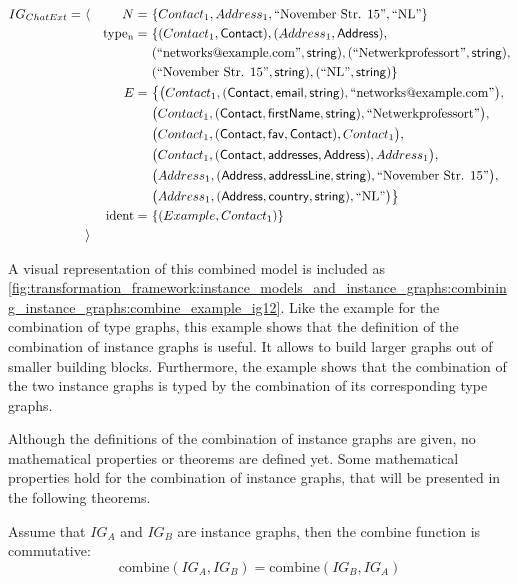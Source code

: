 \begin{align*}
IG_{ChatExt} =\ &\langle&
N =\ &\{ Contact_1, Address_1, \text{``November Str. 15''}, \text{``NL''} \} \\&&
\mathrm{type_{n}} =\ &\{
( Contact_1, \mathsf{Contact} ),
( Address_1, \mathsf{Address} ),\\&&&
( \text{``networks@example.com''}, \mathsf{string} ),
( \text{``Netwerkprofessort''}, \mathsf{string} ),\\&&&
( \text{``November Str. 15''}, \mathsf{string} ),
( \text{``NL''} , \mathsf{string} )
\} \\&&
E =\ &\big\{
\big( Contact_1, ( \mathsf{Contact}, \mathsf{email}, \mathsf{string} ), \text{``networks@example.com''} \big),\\&&&
\big( Contact_1, ( \mathsf{Contact}, \mathsf{firstName}, \mathsf{string} ), \text{``Netwerkprofessort''} \big),\\&&&
\big( Contact_1, ( \mathsf{Contact}, \mathsf{fav}, \mathsf{Contact} ), Contact_1 \big),\\&&&
\big( Contact_1, ( \mathsf{Contact}, \mathsf{addresses}, \mathsf{Address} ), Address_1 \big),\\&&&
\big( Address_1, ( \mathsf{Address}, \mathsf{addressLine}, \mathsf{string} ), \text{``November Str. 15''} \big),\\&&&
\big( Address_1, ( \mathsf{Address}, \mathsf{country}, \mathsf{string} ), \text{``NL''} \big)
\big\} \\&&
\mathrm{ident} =\ &\{
( Example, Contact_1 )
\}
\\&\rangle
\end{align*}

A visual representation of this combined model is included as \cref{fig:transformation_framework:instance_models_and_instance_graphs:combining_instance_graphs:combine_example_ig12}. Like the example for the combination of type graphs, this example shows that the definition of the combination of instance graphs is useful. It allows to build larger graphs out of smaller building blocks. Furthermore, the example shows that the combination of the two instance graphs is typed by the combination of its corresponding type graphs.

Although the definitions of the combination of instance graphs are given, no mathematical properties or theorems are defined yet. Some mathematical properties hold for the combination of instance graphs, that will be presented in the following theorems.

\begin{thm}
\label{defin:transformation_framework:instance_models_and_instance_graphs:combining_instance_graphs:ig_combine_commute}
Assume that $IG_A$ and $IG_B$ are instance graphs, then the $\mathrm{combine}$ function is commutative:
\begin{equation*}
    \mathrm{combine}(IG_A, IG_B) = \mathrm{combine}(IG_B, IG_A)
\end{equation*}
\end{thm}

